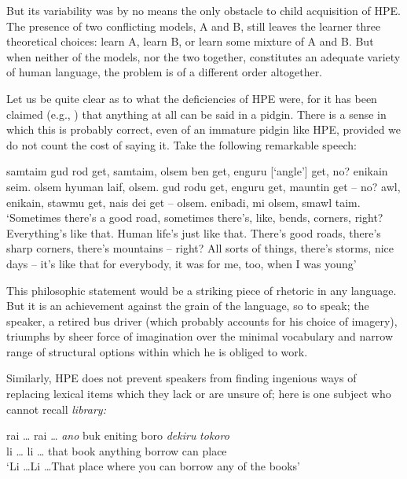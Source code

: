 But its variability was by no means the only obstacle to child acquisition of HPE. The presence of two conflicting models, A and B, still leaves the learner three theoretical choices: learn A, learn B, or learn some mixture of A and B. But when neither of the models, nor the two together, constitutes an adequate variety of human language, the problem is of a different order altogether.

Let us be quite clear as to what the deficiencies of HPE were, for it has been claimed (e.g., \citealt{Samarin1971}) that anything at all can be said in a pidgin. There is a sense in which this is probably correct, even of an immature pidgin like HPE, provided we do not count the cost of saying it. Take the following remarkable speech:

\ea\label{ex:12}
 samtaim gud rod get, samtaim, olsem ben get, enguru [`angle'] get, no? enikain seim. olsem hyuman laif, olsem. gud rodu get, enguru get, mauntin get -- no? awl, enikain, stawmu get, nais dei get -- olsem. enibadi, mi olsem, smawl taim.
\glt  `Sometimes there's a good road, sometimes there's, like, bends, corners, right? Everything's like that. Human life's just like that. There's good roads, there's sharp corners, there's mountains -- right? All sorts of things, there's storms, nice days -- it's like that for everybody, it was for me, too, when I was young'
\z

\noindent This philosophic statement would be a striking piece of rhetoric in any language. But it is an achievement against the grain of the language, so to speak; the speaker, a retired bus driver (which probably accounts for his choice of imagery), triumphs by sheer force of imagination over
the minimal vocabulary and narrow range of structural options within which he is obliged to work.

Similarly, HPE does not prevent speakers from finding ingenious ways of replacing lexical items which they lack or are unsure of; here is one subject who cannot recall \textit{library:}


\ea\label{ex:13}
\gll rai \ldots {} rai \ldots {} \emph{ano} buk eniting boro \emph{dekiru} \emph{tokoro}\\
li \ldots {} li \ldots {} that book anything borrow can place\\
\glt `Li \ldots  Li \ldots  That place where you can borrow any of the books'
\z


